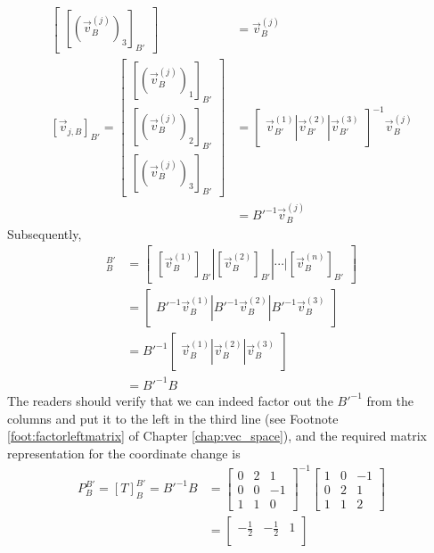 \begin{solution}
\begin{align*}
\begin{bmatrix}
[(\vec{v}_{B}^{(j)})_3]_{B'}
\end{bmatrix}
&=
\vec{v}_{B}^{(j)} \\
[\vec{v}_{j,B}]_{B'} =
\begin{bmatrix}
[(\vec{v}_{B}^{(j)})_1]_{B'} \\
[(\vec{v}_{B}^{(j)})_2]_{B'} \\
[(\vec{v}_{B}^{(j)})_3]_{B'}
\end{bmatrix}
&=
\begin{bmatrix}
\vec{v}_{B'}^{(1)} | \vec{v}_{B'}^{(2)} | \vec{v}_{B'}^{(3)}
\end{bmatrix}^{-1}
\vec{v}_{B}^{(j)} \\
&= B'^{-1}\vec{v}_{B}^{(j)}
\end{align*} 
Subsequently,
\begin{align*}
[T]_B^{B'} &= \begin{bmatrix}
[\vec{v}_{B}^{(1)}]_{B'} | [\vec{v}_{B}^{(2)}]_{B'} | \cdots | [\vec{v}_{B}^{(n)}]_{B'}
\end{bmatrix} \\
&= \begin{bmatrix}
B'^{-1}\vec{v}_{B}^{(1)} | B'^{-1}\vec{v}_{B}^{(2)} | B'^{-1}\vec{v}_{B}^{(3)}
\end{bmatrix} \\
&= B'^{-1}\begin{bmatrix}
\vec{v}_{B}^{(1)} | \vec{v}_{B}^{(2)} | \vec{v}_{B}^{(3)}
\end{bmatrix} \\
&= B'^{-1}B
\end{align*}
The readers should verify that we can indeed factor out the $B'^{-1}$ from the columns and put it to the left in the third line (see Footnote \ref{foot:factorleftmatrix} of Chapter \ref{chap:vec_space}), and the required matrix representation for the coordinate change is
\begin{align*}
P_B^{B'} = [T]_B^{B'} = B'^{-1}B &= 
\begin{bmatrix}
0 & 2 & 1 \\
0 & 0 & -1 \\
1 & 1 & 0
\end{bmatrix}^{-1}
\begin{bmatrix}
1 & 0 & -1\\
0 & 2 & 1 \\
1 & 1 & 2
\end{bmatrix} \\
&=
\begin{bmatrix}
-\frac{1}{2} & -\frac{1}{2} & 1 \\

\end{bmatrix}
\end{align*}
\end{solution}
